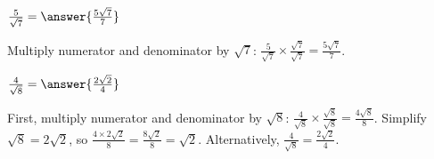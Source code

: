 \documentclass{ximera}
\begin{document}
\begin{problem}
$\frac{5}{\sqrt{7}} = \answer{\frac{5\sqrt{7}}{7}}$

\begin{feedback}
Multiply numerator and denominator by $\sqrt{7}$: $\frac{5}{\sqrt{7}} \times \frac{\sqrt{7}}{\sqrt{7}} = \frac{5\sqrt{7}}{7}$.
\end{feedback}
\end{problem}

\begin{problem}
$\frac{4}{\sqrt{8}} = \answer{\frac{2\sqrt{2}}{4}}$

\begin{feedback}
First, multiply numerator and denominator by $\sqrt{8}$: $\frac{4}{\sqrt{8}} \times \frac{\sqrt{8}}{\sqrt{8}} = \frac{4\sqrt{8}}{8}$. Simplify $\sqrt{8} = 2\sqrt{2}$, so $\frac{4 \times 2\sqrt{2}}{8} = \frac{8\sqrt{2}}{8} = \sqrt{2}$. Alternatively, $\frac{4}{\sqrt{8}} = \frac{2\sqrt{2}}{4}$.
\end{feedback}
\end{problem}
\end{document}
